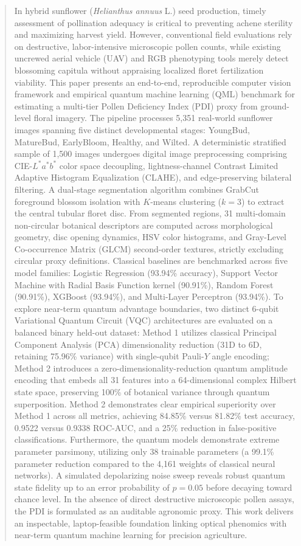 \documentclass{ieeeaccess}
\begin{document}
\begin{abstract}
In hybrid sunflower (\textit{Helianthus annuus} L.) seed production, timely assessment of pollination adequacy is critical to preventing achene sterility and maximizing harvest yield. However, conventional field evaluations rely on destructive, labor-intensive microscopic pollen counts, while existing uncrewed aerial vehicle (UAV) and RGB phenotyping tools merely detect blossoming capitula without appraising localized floret fertilization viability. This paper presents an end-to-end, reproducible computer vision framework and empirical quantum machine learning (QML) benchmark for estimating a multi-tier Pollen Deficiency Index (PDI) proxy from ground-level floral imagery. The pipeline processes 5,351 real-world sunflower images spanning five distinct developmental stages: YoungBud, MatureBud, EarlyBloom, Healthy, and Wilted. A deterministic stratified sample of 1,500 images undergoes digital image preprocessing comprising CIE-$L^*a^*b^*$ color space decoupling, lightness-channel Contrast Limited Adaptive Histogram Equalization (CLAHE), and edge-preserving bilateral filtering. A dual-stage segmentation algorithm combines GrabCut foreground blossom isolation with $K$-means clustering ($k = 3$) to extract the central tubular floret disc. From segmented regions, 31 multi-domain non-circular botanical descriptors are computed across morphological geometry, disc opening dynamics, HSV color histograms, and Gray-Level Co-occurrence Matrix (GLCM) second-order textures, strictly excluding circular proxy definitions. Classical baselines are benchmarked across five model families: Logistic Regression (93.94\% accuracy), Support Vector Machine with Radial Basis Function kernel (90.91\%), Random Forest (90.91\%), XGBoost (93.94\%), and Multi-Layer Perceptron (93.94\%). To explore near-term quantum advantage boundaries, two distinct 6-qubit Variational Quantum Circuit (VQC) architectures are evaluated on a balanced binary held-out dataset: Method 1 utilizes classical Principal Component Analysis (PCA) dimensionality reduction (31D to 6D, retaining 75.96\% variance) with single-qubit Pauli-$Y$ angle encoding; Method 2 introduces a zero-dimensionality-reduction quantum amplitude encoding that embeds all 31 features into a 64-dimensional complex Hilbert state space, preserving 100\% of botanical variance through quantum superposition. Method 2 demonstrates clear empirical superiority over Method 1 across all metrics, achieving 84.85\% versus 81.82\% test accuracy, 0.9522 versus 0.9338 ROC-AUC, and a 25\% reduction in false-positive classifications. Furthermore, the quantum models demonstrate extreme parameter parsimony, utilizing only 38 trainable parameters (a 99.1\% parameter reduction compared to the 4,161 weights of classical neural networks). A simulated depolarizing noise sweep reveals robust quantum state fidelity up to an error probability of $p = 0.05$ before decaying toward chance level. In the absence of direct destructive microscopic pollen assays, the PDI is formulated as an auditable agronomic proxy. This work delivers an inspectable, laptop-feasible foundation linking optical phenomics with near-term quantum machine learning for precision agriculture.
\end{abstract}
\end{document}
